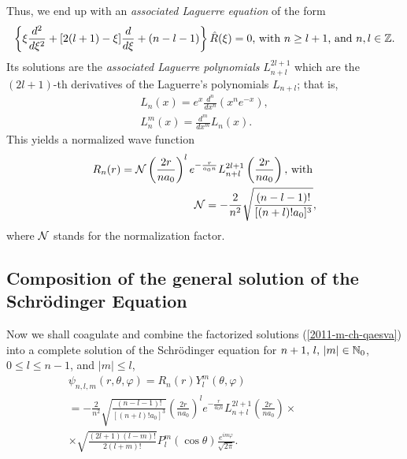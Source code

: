Thus,  we end up with an {\em associated Laguerre equation}
 of the form
\begin{equation}
\left\{
  \xi    \frac{d^2}{   d     \xi  ^2 }
+[2(l+1)-  \xi  ]  \frac{d }{   d       \xi  }
+(n-l-1)
\right\}    \hat{R}(   \xi  ) =0
\textrm{, with } n \ge l+1\textrm{, and } n,l\in {\Bbb Z}.
\label{2011-m-ch-qaeale}
\end{equation}
Its   solutions are  the {\it associated Laguerre polynomials}
$L^{2l+1}_{n+l}$
which are the $(2l+1)$-th derivatives of the
Laguerre's polynomials  $L_{n+l}$; 
that is,
\begin{equation}
\begin{split}
 L_n(x)=e^x   \frac{d^n }{   d     x^n }  \left (x^ne^{-x}\right),\\
 L_n^m(x)=   \frac{d^m }{   d     x^m }  L_n(x).
\end{split}
\label{2011-m-ch-qaelp}
\end{equation}
This yields a normalized wave function
\begin{equation}
\begin{split}
R_n(r) =  {\cal N}
\left( \frac{2 {r}}{n a_0 }\right)^l e^{-\frac{r}{a_0 n}}
L^{2l+1}_{n+l} \left( \frac{2 {r}}{n a_0 }\right)\textrm{, with }\\
{\cal N}   =-\frac{2}{n^2}\sqrt{\frac{(n-l-1)!}{[(n+l)!a_0]^3}} ,
\end{split}
\label{2011-m-ch-qaecsrp}
\end{equation}
where
${\cal N}$ stands for the normalization factor.

\subsection{Composition of the general solution of the Schr\"odinger Equation}

Now we shall coagulate
and combine the factorized solutions (\ref{2011-m-ch-qaesva})
into a complete solution of the Schr\"odinger equation
for $n+1,\, l,\, \vert m \vert  \in {\Bbb N}_0$, $0\le l\le n-1$, and $\vert m \vert \le l$,
\begin{equation}
\begin{split}
\psi_{n,l,m} (r, \theta ,\varphi )
 = R_n(r)Y_l^m ( \theta ,\varphi )\\
 = -\frac{2}{n^2}\sqrt{\frac{(n-l-1)!}{[(n+l)!a_0]^3}}
\left( \frac{2 {r}}{n a_0 }\right)^l e^{-\frac{r}{a_0 n}}
L^{2l+1}_{n+l} \left( \frac{2 {r}}{n a_0 }\right) \times \qquad \qquad  \\
\times \sqrt{\frac {(2l+1)(l-m)!}{2 (l+m)!}}  P_l^m(\cos \theta )
\frac {e^{im\varphi }}{\sqrt{2\pi}} .
\end{split}
\label{2011-m-ch-qaesva13444}
\end{equation}



